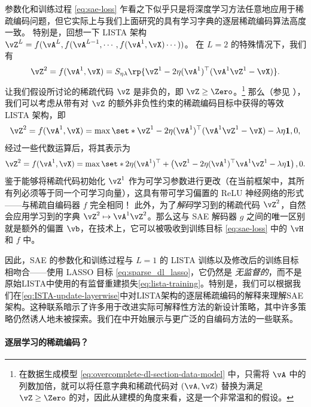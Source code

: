 \documentclass[../../book-main_zh.tex]{subfiles}
\begin{document}
参数化和训练过程 \eqref{eq:sae-loss}
乍看之下似乎只是将深度学习方法任意地应用于稀疏编码问题，但它实际上与我们上面研究的具有学习字典的逐层稀疏编码算法高度一致。
特别是，回想一下 LISTA %
架构 $\vZ^{L} = f(\vA^L, f(\vA^{L-1}, \cdots, f(\vA^1, \vX) \cdots ))$。
在 $L=2$ 的特殊情况下，我们有
\begin{equation}
    \vZ^2 = f(\vA^1, \vX)
    =S_{\eta\lambda}\rp{\vZ^{1} - 2\eta(\vA^{1})^{\top}(\vA^1\vZ^{1} - \vX)}.
\end{equation}
让我们假设所讨论的稀疏代码 $\vZ$ 是非负的，即 $\vZ \geq \Zero$。\footnote{在数据生成模型
    \eqref{eq:overcomplete-dl-section-data-model} 中，只需将 $\vA$
    中的列数加倍，就可以将任意字典和稀疏代码对 $(\vA, \vZ)$ 替换为满足 $\vZ \geq \Zero$
的对，因此从建模的角度来看，这是一个非常温和的假设。}
那么（参见 ），我们可以考虑从带有对 $\vZ$
的额外非负性约束的稀疏编码目标中获得的等效 LISTA 架构，即
\begin{equation}
    \vZ^2 = f(\vA^1, \vX)
    =\max \set*{\vZ^{1} - 2\eta(\vA^{1})^{\top}(\vA^1\vZ^{1} - \vX)
    - \lambda\eta \mathbf{1}, 0},
\end{equation}
经过一些代数运算后，将其表示为
\begin{equation}
    \vZ^2 = f(\vA^1, \vX)
    =\max \set*{
        2\eta(\vA^{1})^{\top}
        +
        \left(
            \vZ^{1} - 2\eta(\vA^{1})^{\top}\vA^1\vZ^{1} - \lambda\eta \mathbf{1}
        \right), 0
    }.
\end{equation}
鉴于能够将稀疏代码初始化 $\vZ^1$ 作为可学习参数进行更改（在当前框架中，其所有列必须等于同一个可学习向量），这具有带可学习偏置的
ReLU 神经网络的形式——与稀疏自编码器 $f$ 完全相同！
此外，为了\textit{解码}学习到的稀疏代码 $\vZ^2$，自然会应用学习到的字典 $\vZ^2 \mapsto \vA^1
\vZ^2$。那么这与 SAE 解码器 $g$ 之间的唯一区别就是额外的偏置 $\vb$，在技术上，它可以被吸收到训练目标
\eqref{eq:sae-loss} 中的 $\vH$ 和 $f$ 中。

因此，SAE 的参数化和训练过程与 $L=1$ 的 LISTA 训练以及修改后的训练目标相吻合——使用 LASSO 目标
\eqref{eq:sparse_dl_lasso}，它仍然是 {\em
无监督的}，而不是原始LISTA中使用的有监督重建损失\eqref{eq:lista-training}。特别是，我们可以根据我们在\eqref{eq:ISTA-update-layerwise}中对LISTA架构的逐层稀疏编码的解释来理解SAE架构。这种联系暗示了许多用于改进实际可解释性方法的新设计策略，其中许多策略仍然诱人地未被探索。我们在中开始展示与更广泛的自编码方法的一些联系。

\paragraph{逐层学习的稀疏编码？}
\end{document}
